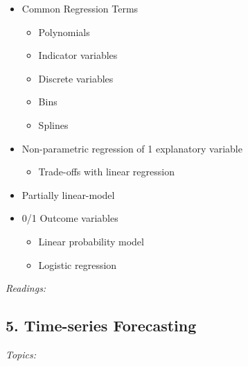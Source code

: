\documentclass[12pt]{article}
\begin{document}
\begin{itemize}
  \item Common Regression Terms
  \begin{itemize}
    \item Polynomials
    \item Indicator variables
    \item Discrete variables
    \item Bins 
    \item Splines
  \end{itemize}

  \item Non-parametric regression of 1 explanatory variable
  \begin{itemize}
    \item Trade-offs with linear regression
  \end{itemize}

  \item Partially linear-model
  
  \item 0/1 Outcome variables
  \begin{itemize}
    \item Linear probability model

    \item Logistic regression
  \end{itemize}
\end{itemize}

\bigskip
\noindent\emph{Readings:}


\subsection*{5. Time-series Forecasting}

\noindent\emph{Topics:}
\end{document}
